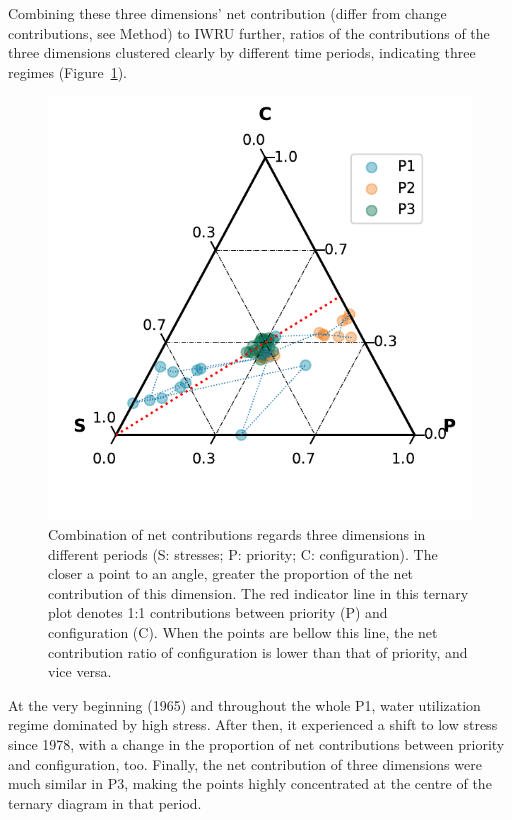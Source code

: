 \documentclass[9pt, twocolumn, twoside, lineno]{pnas-new}
\begin{document}
Combining these three dimensions' net contribution (differ from change contributions, see Method) to IWRU further, ratios of the contributions of the three dimensions clustered clearly by different time periods, indicating three regimes (Figure~\ref{fig:phases}).
\begin{figure}%
	\centering
	\includegraphics[width=\linewidth]{../../figures/main/phases.pdf}
	\caption{Combination of net contributions regards three dimensions in different periods (S: stresses; P: priority; C: configuration). The closer a point to an angle, greater the proportion of the net contribution of this dimension.
	The red indicator line in this ternary plot denotes 1:1 contributions between priority (P) and configuration (C). When the points are bellow this line, the net contribution ratio of configuration is lower than that of priority, and vice versa.}
	\label{fig:phases}
\end{figure}
At the very beginning (1965) and throughout the whole P1, water utilization regime dominated by high stress. After then, it experienced a shift to low stress since 1978, with a change in the proportion of net contributions between priority and configuration, too.
Finally, the net contribution of three dimensions were much similar in P3, making the points highly concentrated at the centre of the ternary diagram in that period.
\end{document}
